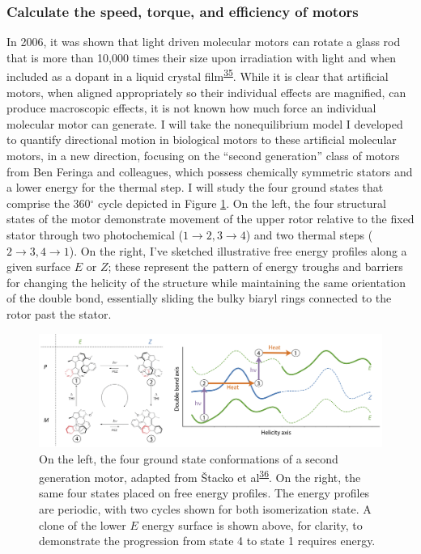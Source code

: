 \documentclass[11pt,notitlepage]{article}
\begin{document}
\hypertarget{calculate-the-speed-torque-and-efficiency-of-motors}{%
\subsubsection{Calculate the speed, torque, and efficiency of
motors}\label{calculate-the-speed-torque-and-efficiency-of-motors}}

In 2006, it was shown that light driven molecular motors can rotate a
glass rod that is more than 10,000 times their size upon irradiation
with light and when included as a dopant in a liquid crystal
film\textsuperscript{\protect\hyperlink{ref-thFGBz32}{35}}. While it is
clear that artificial motors, when aligned appropriately so their
individual effects are magnified, can produce macroscopic effects, it is
not known how much force an individual molecular motor can generate. I
will take the nonequilibrium model I developed to quantify directional
motion in biological motors to these artificial molecular motors, in a
new direction, focusing on the ``second generation'' class of motors
from Ben Feringa and colleagues, which possess chemically symmetric
stators and a lower energy for the thermal step. I will study the four
ground states that comprise the 360\(^\circ\) cycle depicted in Figure
\ref{fig:motors}. On the left, the four structural states of the motor
demonstrate movement of the upper rotor relative to the fixed stator
through two photochemical (\(1 \rightarrow 2, 3 \rightarrow 4\)) and two
thermal steps (\(2 \rightarrow 3, 4 \rightarrow 1\)). On the right, I've
sketched illustrative free energy profiles along a given surface \(E\)
or \(Z\); these represent the pattern of energy troughs and barriers for
changing the helicity of the structure while maintaining the same
orientation of the double bond, essentially sliding the bulky biaryl
rings connected to the rotor past the stator.

\begin{figure}
\centering
\includegraphics[width=1\textwidth,height=\textheight]{content/images/offset-barriers.png}
\caption{On the left, the four ground state conformations of a second
generation motor, adapted from Štacko et
al\textsuperscript{\protect\hyperlink{ref-mKSNFvW7}{36}}. On the right,
the same four states placed on free energy profiles. The energy profiles
are periodic, with two cycles shown for both isomerization state. A
clone of the lower \(E\) energy surface is shown above, for clarity, to
demonstrate the progression from state 4 to state 1 requires
energy.\label{fig:motors}}
\end{figure}
\end{document}
